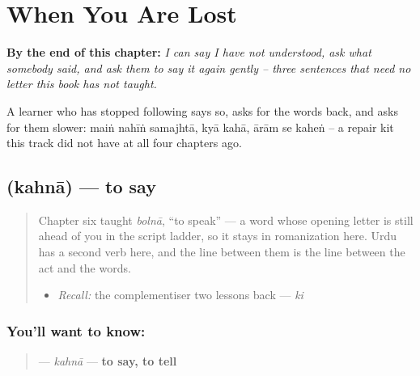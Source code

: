 
\chapter{When You Are Lost}
\label{ch:ur-when-you-are-lost}

\begin{chapteropening}
\textbf{By the end of this chapter:} \emph{I can say I have not understood, ask what somebody said, and ask them to say it again gently -- three sentences that need no letter this book has not taught.}

A learner who has stopped following says so, asks for the words back, and asks for them slower: maiṅ nahīṅ samajhtā, kyā kahā, ārām se kaheṅ -- a repair kit this track did not have at all four chapters ago.
\end{chapteropening}

\section[\texorpdfstring{\ur{کہنا} (kahnā)}{کہنا (kahnā)}]{ (kahnā) — to say}

\label{lesson:UR-C22-kahna}



\begin{quote}
Chapter six taught \emph{bolnā}, \textquotedblleft{}to speak\textquotedblright{} — a word whose opening letter is still ahead of you in the script ladder, so it stays in romanization here. Urdu has a second verb here, and the line between them is the line between the act and the words.

\begin{itemize}
\raggedright
  \item \emph{Recall:} the complementiser two lessons back — \emph{ki}
\end{itemize}
\end{quote}

\subsection*{You'll want to know: }
\begin{quote}
\textbf{} — \emph{kahnā} — \textbf{to say, to tell}
\end{quote}

